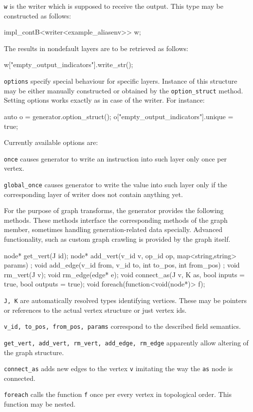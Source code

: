 \begin{description}
\item \texttt{w} is the writer which is supposed to receive the output. This type may be constructed as follows:
\begin{code}
impl_contB<writer<example_aliasenv>> w;
\end{code}
 The results in nondefault layers are to be retrieved as follows:
\begin{code}
w["empty_output_indicators"].write_str();
\end{code}
\item \texttt{options} specify special behaviour for specific layers. Instance of this structure may be either manually constructed or obtained by the \texttt{option\_struct} method. Setting options works exactly as in case of the writer. For instance:
\begin{code}
auto o = generator.option_struct();
o["empty_output_indicators"].unique = true;
\end{code}
Currently available options are:
\begin{description}
\item \texttt{once} causes generator to write an instruction into such layer only once per vertex.
\item \texttt{global\_once} causes generator to write the value into such layer only if the corresponding layer of writer does not contain anything yet.
\end{description}
\end{description}

For the purpose of graph transforms, the generator provides the following methods. These methods interface the corresponding methods of the graph member, sometimes handling generation-related data specially. Advanced functionality, such as custom graph crawling is provided by the graph itself.
\begin{code}
node* get_vert(J id);
node* add_vert(v_id v, op_id op, map<string,string> params) ;
void add_edge(v_id from, v_id to, int to_pos, int from_pos) ;
void rm_vert(J v);
void rm_edge(edge* e);
void connect_as(J v, K as, bool inputs = true, bool outputs = true);
void foreach(function<void(node*)> f);
\end{code}

\begin{description}
  \item \texttt{J, K} are automatically resolved types identifying vertices. These may be pointers or references to the actual vertex structure or just vertex ids.
  \item \texttt{v\_id, to\_pos, from\_pos, params} correspond to the described field semantics.
  \item \texttt{get\_vert, add\_vert, rm\_vert, add\_edge, rm\_edge} apparently allow altering of the graph structure.
  \item \texttt{connect\_as} adds new edges to the vertex \texttt{v} imitating the way the \texttt{as} node is connected.
  \item \texttt{foreach} calls the function \texttt{f} once per every vertex in topological order. This function may be nested.
\end{description}

